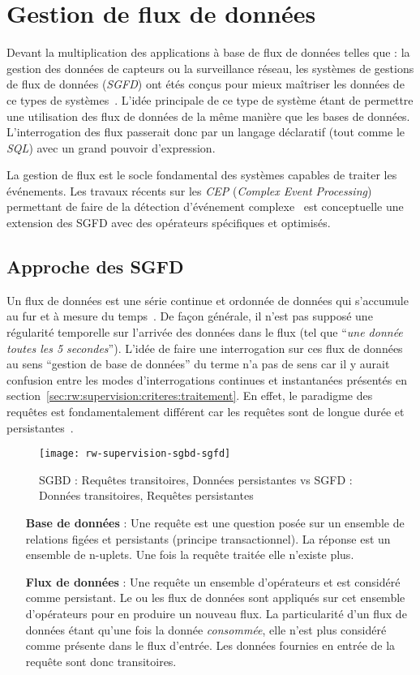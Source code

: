 \section{Gestion de flux de données}
Devant la multiplication des applications à base de flux de données telles que : la gestion des données de capteurs ou la surveillance réseau, les systèmes de gestions de flux de données (\textit{SGFD}) ont étés conçus pour mieux maîtriser les données de ce types de systèmes~\cite{Madden:tag, Yao:cougar, Cranor:gigascope}. L'idée principale de ce type de système étant de permettre une utilisation des flux de données de la même manière que les bases de données. L'interrogation des flux passerait donc par un langage déclaratif (tout comme le \textit{SQL}) avec un grand pouvoir d'expression.

La gestion de flux est le socle fondamental des systèmes capables de traiter les événements. Les travaux récents sur les \textit{CEP} (\textit{Complex Event Processing}) permettant de faire de la détection d'événement complexe~\cite{Brenna:cayuga} est conceptuelle une extension des SGFD avec des opérateurs spécifiques et optimisés.
\subsection{Approche des SGFD}
Un flux de données est une série continue et ordonnée de données qui s'accumule au fur et à mesure du temps~\cite{Golab:issues}. De façon générale, il n'est pas supposé une régularité temporelle sur l'arrivée des données dans le flux (tel que \enquote{\it une donnée toutes les 5 secondes}). L'idée de faire une interrogation sur ces flux de données au sens \enquote{gestion de base de données} du terme n'a pas de sens car il y aurait confusion entre les modes d'interrogations continues et instantanées présentés en section~\ref{sec:rw:supervision:criteres:traitement}. En effet, le paradigme des requêtes est fondamentalement différent car les requêtes sont de longue durée et persistantes~\cite{Chen:niagaracq}.
\begin{figure}[ht]
    \centering
    \texttt{[image: rw-supervision-sgbd-sgfd]}
    \caption{SGBD : Requêtes transitoires, Données persistantes vs SGFD : Données transitoires, Requêtes persistantes~\cite{Gurgen:sstreamware}}
\end{figure}

\begin{itemize}
    \item[\textbf{Base de données}] : Une requête est une question posée sur un ensemble de relations figées et persistants (principe transactionnel). La réponse est un ensemble de n-uplets. Une fois la requête traitée elle n'existe plus.
    \item[\textbf{Flux de données}] : Une requête un ensemble d'opérateurs et est considéré comme persistant. Le ou les flux de données sont appliqués sur cet ensemble d'opérateurs pour en produire un nouveau flux. La particularité d'un flux de données étant qu'une fois la donnée \textit{consommée}, elle n'est plus considéré comme présente dans le flux d'entrée. Les données fournies en entrée de la requête sont donc transitoires.
\end{itemize}

